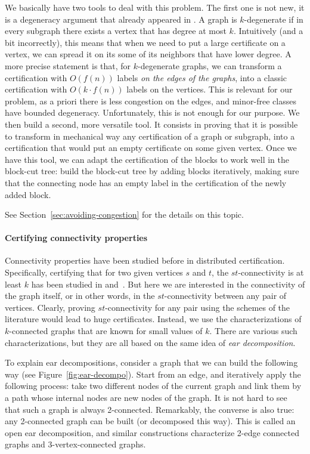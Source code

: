 \documentclass[a4paper,thm-restate,USenglish]{lipics-v2019}
\begin{document}
We basically have two tools to deal with this problem. The first one is not new, it is a degeneracy argument that already appeared in \cite{FeuilloleyFMRRT20, FeuilloleyFMRRT21}. 
A graph is $k$-degenerate if in every subgraph there exists a vertex that has degree at most $k$. Intuitively (and a bit incorrectly), this means that when we need to put a large certificate on a vertex, we can spread it on its some of its neighbors that have lower degree.
A more precise statement is that, for $k$-degenerate graphs, we can transform a certification with $O(f(n))$ labels \emph{on the edges of the graphs}, into a classic certification with $O(k \cdot f(n))$ labels on the vertices. 
This is relevant for our problem, as a priori there is less congestion on the edges, and minor-free classes have bounded degeneracy.
Unfortunately, this is not enough for our purpose. We then build a second, more versatile tool. 
It consists in proving that it is possible to transform in mechanical way any certification of a graph or subgraph, into a certification that would put an empty certificate on some given vertex. 
Once we have this tool, we can adapt the certification of the blocks to work well in the block-cut tree: build the block-cut tree by adding blocks iteratively, making sure that the connecting node has an empty label in the certification of the newly added block.

See Section~\ref{sec:avoiding-congestion} for the details on this topic.

\paragraph*{Certifying connectivity properties}

Connectivity properties have been studied before in distributed certification. 
Specifically, certifying that for two given vertices $s$ and $t$, the $st$-connectivity is at least $k$ has been studied in \cite{KormanKP10} and~\cite{GoosS16}. 
But here we are interested in the connectivity of the graph itself, or in other words, in the $st$-connectivity between any pair of vertices. 
Clearly, proving $st$-connectivity for any pair using the schemes of the literature would lead to huge certificates. 
Instead, we use the characterizations of $k$-connected graphs that are known for small values of $k$. There are various such characterizations, but they are all based on the same idea of \emph{ear decomposition}. 

To explain ear decompositions, consider a graph that we can build the following way (see Figure~\ref{fig:ear-decompo}). 
Start from an edge, and iteratively apply the following process: take two different nodes of the current graph and link them by a path whose internal nodes are new nodes of the graph. It is not hard to see that such a graph is always 2-connected. 
Remarkably, the converse is also true: any 2-connected graph can be built (or decomposed this way). This is called an open ear decomposition, and similar constructions characterize 2-edge connected graphs and 3-vertex-connected graphs.
\end{document}
